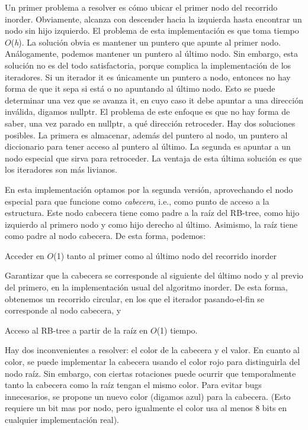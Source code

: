 Un primer problema a resolver es cómo ubicar el primer nodo del recorrido inorder. Obviamente, alcanza con descender hacia la izquierda hasta encontrar un nodo sin hijo izquierdo. El problema de esta implementación es que toma tiempo $O$({\itshape h}). La solución obvia es mantener un puntero que apunte al primer nodo. Análogamente, podemos mantener un puntero al último nodo. Sin embargo, esta solución no es del todo satisfactoria, porque complica la implementación de los iteradores. Si un iterador {\ttfamily it} es únicamente un puntero a nodo, entonces no hay forma de que {\ttfamily it} sepa si está o no apuntando al último nodo. Esto se puede determinar una vez que se avanza {\ttfamily it}, en cuyo caso {\ttfamily it} debe apuntar a una dirección inválida, digamos {\ttfamily nullptr}. El problema de este enfoque es que no hay forma de saber, una vez parado en {\ttfamily nullptr}, a qué dirección retroceder. Hay dos soluciones posibles. La primera es almacenar, además del puntero al nodo, un puntero al diccionario para tener acceso al puntero al último. La segunda es apuntar a un nodo especial que sirva para retroceder. La ventaja de esta última solución es que los iteradores son más livianos.

En esta implementación optamos por la segunda versión, aprovechando el nodo especial para que funcione como {\itshape cabecera}, i.\-e., como punto de acceso a la estructura. Este nodo cabecera tiene como padre a la raíz del R\-B-\/tree, como hijo izquierdo al primero nodo y como hijo derecho al último. Asimismo, la raíz tiene como padre al nodo cabecera. De esta forma, podemos\-:
\begin{DoxyEnumerate}
\item Acceder en $O$(1) tanto al primer como al último nodo del recorrido inorder
\item Garantizar que la cabecera se corresponde al siguiente del último nodo y al previo del primero, en la implementación usual del algoritmo inorder. De esta forma, obtenemos un recorrido circular, en los que el iterador pasando-\/el-\/fin se corresponde al nodo cabecera, y
\item Acceso al R\-B-\/tree a partir de la raíz en $O$(1) tiempo.
\end{DoxyEnumerate}

Hay dos inconvenientes a resolver\-: el color de la cabecera y el valor. En cuanto al color, se puede implementar la cabecera usando el color rojo para distinguirla del nodo raíz. Sin embargo, con ciertas rotaciones puede ocurrir que temporalmente tanto la cabecera como la raíz tengan el mismo color. Para evitar bugs innecesarios, se propone un nuevo color (digamos azul) para la cabecera. (Esto requiere un bit mas por nodo, pero igualmente el color usa al menos 8 bits en cualquier implementación real).

